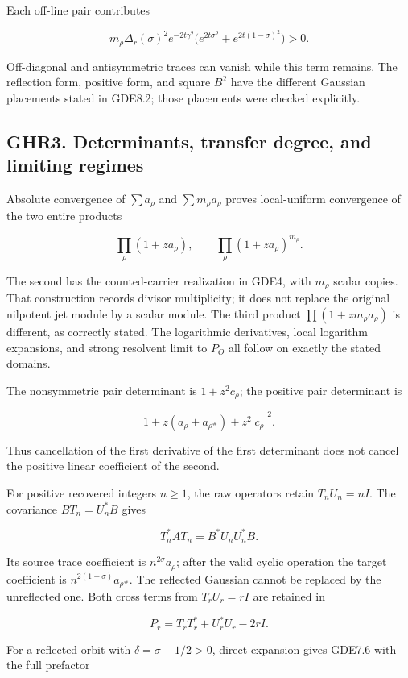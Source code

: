 \documentclass[
]{article}
\begin{document}
Each off-line pair contributes

\[
m_\rho\Delta_r(\sigma)^2e^{-2t\gamma^2}
\bigl(e^{2t\sigma^2}+e^{2t(1-\sigma)^2}\bigr)>0.
\]

Off-diagonal and antisymmetric traces can vanish while this term remains. The reflection form, positive form, and square \(B^2\) have the different Gaussian placements stated in GDE8.2; those placements were checked explicitly.

\subsection{GHR3. Determinants, transfer degree, and limiting regimes}\label{ghr3.-determinants-transfer-degree-and-limiting-regimes}

Absolute convergence of \(\sum a_\rho\) and \(\sum m_\rho a_\rho\) proves local-uniform convergence of the two entire products

\[
\prod_\rho(1+za_\rho),\qquad
\prod_\rho(1+za_\rho)^{m_\rho}.
\]

The second has the counted-carrier realization in GDE4, with \(m_\rho\) scalar copies. That construction records divisor multiplicity; it does not replace the original nilpotent jet module by a scalar module. The third product \(\prod(1+zm_\rho a_\rho)\) is different, as correctly stated. The logarithmic derivatives, local logarithm expansions, and strong resolvent limit to \(P_O\) all follow on exactly the stated domains.

The nonsymmetric pair determinant is \(1+z^2c_\rho\); the positive pair determinant is

\[
1+z(a_\rho+a_{\rho^\#})+z^2|c_\rho|^2.
\]

Thus cancellation of the first derivative of the first determinant does not cancel the positive linear coefficient of the second.

For positive recovered integers \(n\ge1\), the raw operators retain \(T_nU_n=nI\). The covariance \(BT_n=U_n^*B\) gives

\[
T_n^*AT_n=B^*U_nU_n^*B.
\]

Its source trace coefficient is \(n^{2\sigma}a_\rho\); after the valid cyclic operation the target coefficient is \(n^{2(1-\sigma)}a_{\rho^\#}\). The reflected Gaussian cannot be replaced by the unreflected one. Both cross terms from \(T_rU_r=rI\) are retained in

\[
P_r=T_rT_r^*+U_r^*U_r-2rI.
\]

For a reflected orbit with \(\delta=\sigma-1/2>0\), direct expansion gives GDE7.6 with the full prefactor
\end{document}
